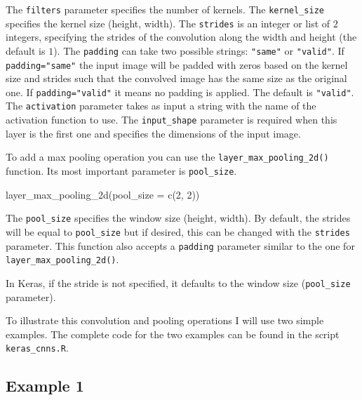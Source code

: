 \documentclass[
  11pt,
]{krantz}
\makeatletter
\newenvironment{Shaded}{\begin{snugshade}}{\end{snugshade}}
\newcommand{\AttributeTok}[1]{\textcolor[rgb]{0.61,0.61,0.61}{#1}}
\newcommand{\DecValTok}[1]{\textcolor[rgb]{0.06,0.06,0.06}{#1}}
\newcommand{\FunctionTok}[1]{\textcolor[rgb]{0,0,0}{#1}}
\newcommand{\NormalTok}[1]{#1}
\newenvironment{kframe}{%
\medskip{}
\setlength{\fboxsep}{.8em}
 \def\at@end@of@kframe{}%
 \ifinner\ifhmode%
  \def\at@end@of@kframe{\end{minipage}}%
  \begin{minipage}{\columnwidth}%
 \fi\fi%
 \def\FrameCommand##1{\hskip\@totalleftmargin \hskip-\fboxsep
 \colorbox{shadecolor}{##1}\hskip-\fboxsep
     \hskip-\linewidth \hskip-\@totalleftmargin \hskip\columnwidth}%
 \MakeFramed {\advance\hsize-\width
   \@totalleftmargin\z@ \linewidth\hsize
   \@setminipage}}%
 {\par\unskip\endMakeFramed%
 \at@end@of@kframe}
\newenvironment{rmdblock}[1]
  {
  \begin{itemize}
  \renewcommand{\labelitemi}{
    \raisebox{-.7\height}[0pt][0pt]{
      {\setkeys{Gin}{width=3em,keepaspectratio}\texttt{[image: images/icons/\#1]}}
    }
  }
  \setlength{\fboxsep}{1em}
  \begin{kframe}
  \item
  }
  {
  \end{kframe}
  \end{itemize}
  }
\newenvironment{rmdinfo}
  {\begin{rmdblock}{info}}
  {\end{rmdblock}}
\makeatother
\begin{document}
The \texttt{filters} parameter specifies the number of kernels. The \texttt{kernel\_size} specifies the kernel size (height, width). The \texttt{strides} is an integer or list of \(2\) integers, specifying the strides of the convolution along the width and height (the default is \(1\)). The \texttt{padding} can take two possible strings: \texttt{"same"} or \texttt{"valid"}. If \texttt{padding="same"} the input image will be padded with zeros based on the kernel size and strides such that the convolved image has the same size as the original one. If \texttt{padding="valid"} it means no padding is applied. The default is \texttt{"valid"}. The \texttt{activation} parameter takes as input a string with the name of the activation function to use. The \texttt{input\_shape} parameter is required when this layer is the first one and specifies the dimensions of the input image.

To add a max pooling operation you can use the \texttt{layer\_max\_pooling\_2d()} function. Its most important parameter is \texttt{pool\_size}.

\begin{Shaded}
\begin{Highlighting}[]
\FunctionTok{layer\_max\_pooling\_2d}\NormalTok{(}\AttributeTok{pool\_size =} \FunctionTok{c}\NormalTok{(}\DecValTok{2}\NormalTok{, }\DecValTok{2}\NormalTok{))}
\end{Highlighting}
\end{Shaded}

The \texttt{pool\_size} specifies the window size (height, width). By default, the strides will be equal to \texttt{pool\_size} but if desired, this can be changed with the \texttt{strides} parameter. This function also accepts a \texttt{padding} parameter similar to the one for \texttt{layer\_max\_pooling\_2d()}.

\begin{rmdinfo}
In Keras, if the stride is not specified, it defaults to the window size (\texttt{pool\_size} parameter).
\end{rmdinfo}

To illustrate this convolution and pooling operations I will use two simple examples. The complete code for the two examples can be found in the script \texttt{keras\_cnns.R}.

\hypertarget{example-1}{%
\subsection{Example 1}\label{example-1}}
\end{document}
